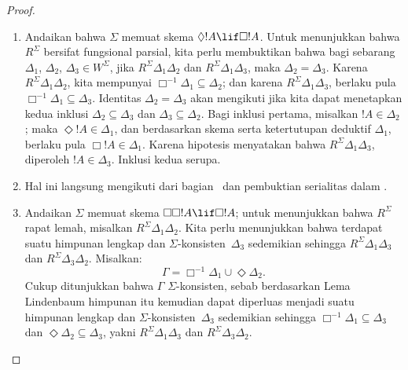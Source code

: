 \documentclass[../../../include/open-logic-section]{subfiles}
\begin{document}
\begin{proof}
  \begin{enumerate}
  \item Andaikan bahwa $\Sigma$ memuat skema $\Diamond !A \lif
    \Box !A$. Untuk menunjukkan bahwa $R^\Sigma$ bersifat fungsional parsial,
    kita perlu membuktikan bahwa bagi sebarang $\Delta_1$, $\Delta_2$,
    $\Delta_3 \in W^\Sigma$, jika $R^\Sigma \Delta_1\Delta_2$ dan $R^\Sigma
    \Delta_1\Delta_3$, maka $\Delta_2=\Delta_3$. Karena $R^\Sigma
    \Delta_1\Delta_2$, kita mempunyai $\Box^{-1}\Delta_1 \subseteq \Delta_2$;
    dan karena $R^\Sigma \Delta_1\Delta_3$, berlaku pula
    $\Box^{-1}\Delta_1 \subseteq \Delta_3$. Identitas
    $\Delta_2=\Delta_3$ akan mengikuti jika kita dapat menetapkan kedua
    inklusi $\Delta_2 \subseteq \Delta_3$ dan $\Delta_3 \subseteq
    \Delta_2$. Bagi inklusi pertama, misalkan $!A \in \Delta_2$; maka
    $\Diamond!A \in \Delta_1$, dan berdasarkan skema serta ketertutupan
    deduktif $\Delta_1$, berlaku pula $\Box!A \in \Delta_1$. Karena hipotesis
    menyatakan bahwa $R^\Sigma \Delta_1\Delta_3$, diperoleh
    $!A \in \Delta_3$. Inklusi kedua serupa.

  \item Hal ini langsung mengikuti dari bagian~
    dan pembuktian serialitas dalam .

  \item Andaikan $\Sigma$ memuat skema $\Box\Box!A \lif \Box!A$; untuk
    menunjukkan bahwa $R^\Sigma$ rapat lemah, misalkan $R^\Sigma
    \Delta_1\Delta_2$. Kita perlu menunjukkan bahwa terdapat suatu himpunan
    lengkap dan $\Sigma$-konsisten~$\Delta_3$ sedemikian sehingga
    $R^\Sigma \Delta_1\Delta_3$ dan $R^\Sigma \Delta_3\Delta_2$. Misalkan:
    \[
    \Gamma = \Box^{-1}\Delta_1 \cup \Diamond\Delta_2.
    \]
    Cukup ditunjukkan bahwa $\Gamma$ $\Sigma$-konsisten, sebab berdasarkan
    Lema Lindenbaum himpunan itu kemudian dapat diperluas menjadi suatu
    himpunan lengkap dan $\Sigma$-konsisten~$\Delta_3$ sedemikian sehingga
    $\Box^{-1}\Delta_1 \subseteq \Delta_3$ dan
    $\Diamond\Delta_2 \subseteq \Delta_3$, yakni
    $R^\Sigma \Delta_1\Delta_3$ dan $R^\Sigma
    \Delta_3\Delta_2$.


\end{enumerate}
\end{proof}
\end{document}
